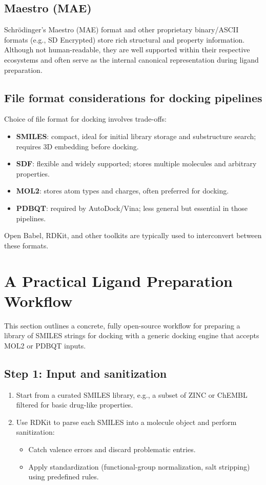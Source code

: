 \documentclass[12pt, a4paper]{article}
\begin{document}
\subsection{Maestro (MAE)}

Schr\"odinger's Maestro (MAE) format and other proprietary binary/ASCII formats (e.g., SD Encrypted) store rich structural and property information. Although not human-readable, they are well supported within their respective ecosystems and often serve as the internal canonical representation during ligand preparation.

\subsection{File format considerations for docking pipelines}

Choice of file format for docking involves trade-offs:
\begin{itemize}
  \item \textbf{SMILES}: compact, ideal for initial library storage and substructure search; requires 3D embedding before docking.
  \item \textbf{SDF}: flexible and widely supported; stores multiple molecules and arbitrary properties.
  \item \textbf{MOL2}: stores atom types and charges, often preferred for docking.
  \item \textbf{PDBQT}: required by AutoDock/Vina; less general but essential in those pipelines.
\end{itemize}

Open Babel, RDKit, and other toolkits are typically used to interconvert between these formats.\cite{CH6_OBoyle2011}

\section{A Practical Ligand Preparation Workflow}

This section outlines a concrete, fully open-source workflow for preparing a library of SMILES strings for docking with a generic docking engine that accepts MOL2 or PDBQT inputs.

\subsection{Step 1: Input and sanitization}

\begin{enumerate}
  \item Start from a curated SMILES library, e.g., a subset of ZINC or ChEMBL filtered for basic drug-like properties.
  \item Use RDKit to parse each SMILES into a molecule object and perform sanitization:
  \begin{itemize}
    \item Catch valence errors and discard problematic entries.
    \item Apply standardization (functional-group normalization, salt stripping) using predefined rules.
  \end{itemize}
\end{enumerate}
\end{document}
